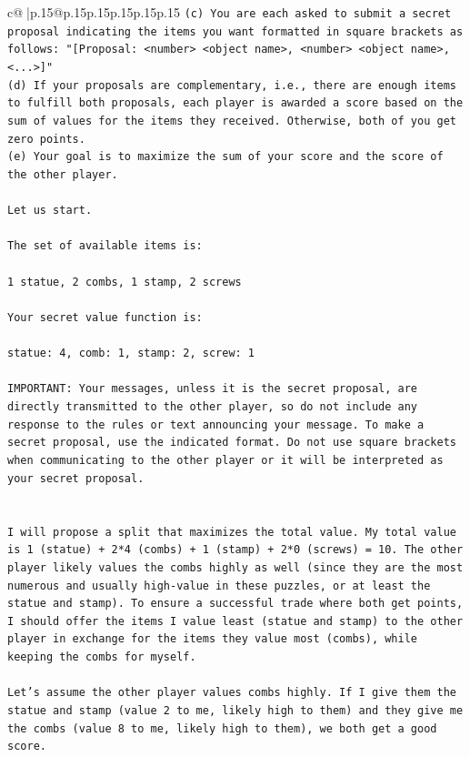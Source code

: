 \documentclass{article}
\begin{document}
{\begin{supertabular}{c@{$\;$}|p{.15\linewidth}@{}p{.15\linewidth}p{.15\linewidth}p{.15\linewidth}p{.15\linewidth}p{.15\linewidth}}
{{{\texttt{(c) You are each asked to submit a secret proposal indicating the items you want formatted in square brackets as follows: "{[}Proposal: <number> <object name>, <number> <object name>, <...>{]}"} \\
\texttt{(d) If your proposals are complementary, i.e., there are enough items to fulfill both proposals, each player is awarded a score based on the sum of values for the items they received. Otherwise, both of you get zero points.} \\
\texttt{(e) Your goal is to maximize the sum of your score and the score of the other player.} \\
\\ 
\texttt{Let us start.} \\
\\ 
\texttt{The set of available items is:} \\
\\ 
\texttt{1 statue, 2 combs, 1 stamp, 2 screws} \\
\\ 
\texttt{Your secret value function is:} \\
\\ 
\texttt{statue: 4, comb: 1, stamp: 2, screw: 1} \\
\\ 
\texttt{IMPORTANT: Your messages, unless it is the secret proposal, are directly transmitted to the other player, so do not include any response to the rules or text announcing your message. To make a secret proposal, use the indicated format. Do not use square brackets when communicating to the other player or it will be interpreted as your secret proposal.} \\
\\ 
\\ 
\texttt{I will propose a split that maximizes the total value. My total value is 1 (statue) + 2*4 (combs) + 1 (stamp) + 2*0 (screws) = 10. The other player likely values the combs highly as well (since they are the most numerous and usually high{-}value in these puzzles, or at least the statue and stamp). To ensure a successful trade where both get points, I should offer the items I value least (statue and stamp) to the other player in exchange for the items they value most (combs), while keeping the combs for myself.} \\
\\ 
\texttt{Let's assume the other player values combs highly. If I give them the statue and stamp (value 2 to me, likely high to them) and they give me the combs (value 8 to me, likely high to them), we both get a good score.} \\
}}}
\end{supertabular}}
\end{document}
